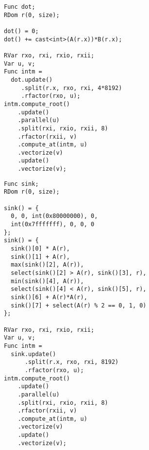 \begin{lstlisting}[caption={Benchmark code for dot product}, label={lst:benchmark_dot_product}]
Func dot;
RDom r(0, size);

dot() = 0;
dot() += cast<int>(A(r.x))*B(r.x);

RVar rxo, rxi, rxio, rxii;
Var u, v;
Func intm =
  dot.update()
     .split(r.x, rxo, rxi, 4*8192)
     .rfactor(rxo, u);
intm.compute_root()
    .update()
    .parallel(u)
    .split(rxi, rxio, rxii, 8)
    .rfactor(rxii, v)
    .compute_at(intm, u)
    .vectorize(v)
    .update()
    .vectorize(v);
\end{lstlisting}

\begin{lstlisting}[caption={Benchmark code for kitchen sink.}, label={lst:benchmark_kitchen_sink}]
Func sink;
RDom r(0, size);

sink() = {
  0, 0, int(0x80000000), 0,
  int(0x7fffffff), 0, 0, 0
};
sink() = {
  sink()[0] * A(r),
  sink()[1] + A(r),
  max(sink()[2], A(r)),
  select(sink()[2] > A(r), sink()[3], r),
  min(sink()[4], A(r)),
  select(sink()[4] < A(r), sink()[5], r),
  sink()[6] + A(r)*A(r),
  sink()[7] + select(A(r) % 2 == 0, 1, 0)
};

RVar rxo, rxi, rxio, rxii;
Var u, v;
Func intm =
  sink.update()
      .split(r.x, rxo, rxi, 8192)
      .rfactor(rxo, u);
intm.compute_root()
    .update()
    .parallel(u)
    .split(rxi, rxio, rxii, 8)
    .rfactor(rxii, v)
    .compute_at(intm, u)
    .vectorize(v)
    .update()
    .vectorize(v);
\end{lstlisting}
